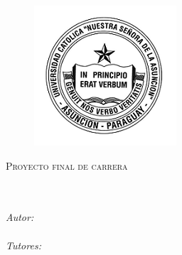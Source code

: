 \documentclass[
11pt, %
english, %
spanish,
singlespacing, %
liststotoc, %
parskip, %
headsepline, %
]{MastersDoctoralThesis} %
\author{Luis F. \textsc{Villalba V.}} %
\begin{document}
\frontmatter %
\pagestyle{plain} %


\begin{titlepage}
\begin{center}

\begin{figure}[H]
\centering
\includegraphics{Figuras/uca}
\decoRule
\end{figure}

{\scshape\LARGE \univname\par}\vspace{1.5cm} %
\textsc{\Large Proyecto final de carrera}\\[0.5cm] %

\HRule \\[0.4cm] %
{\huge \bfseries \ttitle\par}\vspace{0.4cm} %
\HRule \\[1cm] %

\Large \emph{Autor:}\\
\Large \href{}{\authorname} \\[5mm] %
\Large \emph{Tutores:}\\
\Large \href{}{\supname} \\[1cm]

\Large \facname\\ %
\Large \deptname \\[5mm]

{\large\the\year}\\[1cm] %

\end{center}
\end{titlepage}
\end{document}
